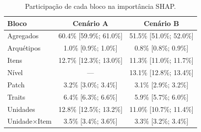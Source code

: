 \begin{table}[htbp]
\caption{Participação de cada bloco na importância SHAP.}
\label{tab:blocos}
\centering
\small
\begin{tabular}{lcc}
\toprule
Bloco & Cenário A & Cenário B \\
\midrule
Agregados & 60.4\% [59.9\%; 61.0\%] & 51.5\% [51.0\%; 52.0\%] \\
Arquétipos & 1.0\% [0.9\%; 1.0\%] & 0.8\% [0.8\%; 0.9\%] \\
Itens & 12.7\% [12.3\%; 13.0\%] & 11.3\% [11.0\%; 11.7\%] \\
Nível & — & 13.1\% [12.8\%; 13.4\%] \\
Patch & 3.2\% [3.0\%; 3.4\%] & 3.1\% [2.9\%; 3.2\%] \\
Traits & 6.4\% [6.3\%; 6.6\%] & 5.9\% [5.7\%; 6.0\%] \\
Unidades & 12.8\% [12.5\%; 13.2\%] & 11.0\% [10.7\%; 11.4\%] \\
Unidade×Item & 3.5\% [3.4\%; 3.6\%] & 3.3\% [3.2\%; 3.4\%] \\
\bottomrule
\end{tabular}
\end{table}
